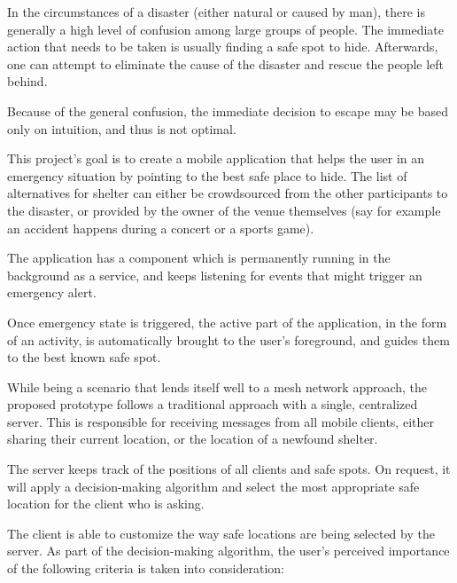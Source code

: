 
In the circumstances of a disaster (either natural or caused by man), there is
generally a high level of confusion among large groups of people. The
immediate action that needs to be taken is usually finding a safe spot to
hide. Afterwards, one can attempt to eliminate the cause of the disaster and
rescue the people left behind.

Because of the general confusion, the immediate decision to escape may be based
only on intuition, and thus is not optimal.

This project's goal is to create a mobile application that helps the user in an
emergency situation by pointing to the best safe place to hide. The list of
alternatives for shelter can either be crowdsourced from the other
participants to the disaster, or provided by the owner of the venue themselves
(say for example an accident happens during a concert or a sports game).

The application has a component which is permanently running in the background
as a service, and keeps listening for events that might trigger an emergency
alert.

Once emergency state is triggered, the active part of the application, in the
form of an activity, is automatically brought to the user's foreground, and
guides them to the best known safe spot.

While being a scenario that lends itself well to a mesh network approach, the
proposed prototype follows a traditional approach with a single, centralized
server. This is responsible for receiving messages from all mobile clients,
either sharing their current location, or the location of a newfound shelter.

The server keeps track of the positions of all clients and safe spots. On
request, it will apply a decision-making algorithm and select the most
appropriate safe location for the client who is asking.

The client is able to customize the way safe locations are being selected by
the server. As part of the decision-making algorithm, the user's perceived
importance of the following criteria is taken into consideration:

